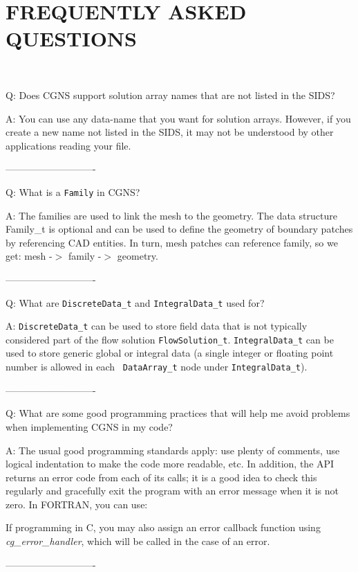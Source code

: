 \documentclass[12pt]{article}
\begin{document}
\newpage
\section{FREQUENTLY ASKED QUESTIONS} \label{sec:FAQ}

~

Q:  Does CGNS support solution array names that are not listed in the SIDS?

A:  You can use any data-name that you want for solution arrays.  However,
if you create a new name not listed in the SIDS, it may not be understood
by other applications reading your file.

----------------------------

Q:  What is a {\tt Family} in CGNS?

A:  The families are used to link the mesh to the geometry.  The data
structure Family\_t is optional and can be used to define the geometry
of boundary patches by referencing CAD entities.  In turn, mesh
patches can reference family, so we get:  mesh -$>$ family -$>$ geometry.

----------------------------

Q:  What are {\tt DiscreteData\_t} and {\tt IntegralData\_t} used for?

A: {\tt DiscreteData\_t} can be used to store field data that is not
typically considered part of the flow solution {\tt FlowSolution\_t}.
{\tt IntegralData\_t} can be used to store generic global or integral
data (a single integer or floating point number is allowed in each {\tt
DataArray\_t} node under {\tt IntegralData\_t}).

----------------------------

Q:  What are some good programming practices that will help me avoid
problems when implementing CGNS in my code?

A:  The usual good programming standards apply:  
use plenty of comments, use logical indentation to make the code more
readable, etc.  In addition, the API returns an error code from
each of its calls; it is a good idea to check this regularly and
gracefully exit the program with an error message when it is not
zero.  In FORTRAN, you can use:


\noindent If programming in C, you may also assign an error callback function
using {\it cg\_error\_handler}, which will be called in the case
of an error.

----------------------------
\end{document}
